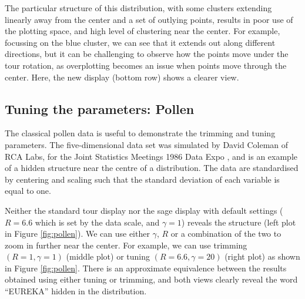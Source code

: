 \documentclass[]{interact}
\theoremstyle{plain}%
\theoremstyle{definition}
\theoremstyle{remark}
\begin{document}
The particular structure of this distribution, with some clusters
extending linearly away from the center and a set of outlying points,
results in poor use of the plotting space, and high level of clustering
near the center. For example, focussing on the blue cluster, we can see
that it extends out along different directions, but it can be
challenging to observe how the points move under the tour rotation, as
overplotting becomes an issue when points move through the center. Here,
the new display (bottom row) shows a clearer view.

\hypertarget{sec:appl4}{%
\subsection{Tuning the parameters: Pollen}\label{sec:appl4}}

The classical pollen data is useful to demonstrate the trimming and
tuning parameters. The five-dimensional data set was simulated by David
Coleman of RCA Labs, for the Joint Statistics Meetings 1986 Data Expo
\citep{pollen}, and is an example of a hidden structure near the centre
of a distribution. The data are standardised by centering and scaling
such that the standard deviation of each variable is equal to one.

Neither the standard tour display nor the sage display with default
settings (\(R=6.6\) which is set by the data scale, and \(\gamma=1\))
reveals the structure (left plot in Figure \ref{fig:pollen}). We can use
either \(\gamma\), \(R\) or a combination of the two to zoom in further
near the center. For example, we can use trimming \((R=1, \gamma=1)\)
(middle plot) or tuning \((R=6.6,\gamma=20)\) (right plot) as shown in
Figure \ref{fig:pollen}. There is an approximate equivalence between the
results obtained using either tuning or trimming, and both views clearly
reveal the word ``EUREKA'' hidden in the distribution.
\end{document}

